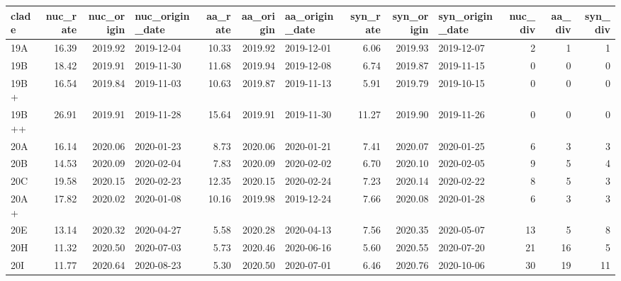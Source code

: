 \begin{tabular}{lrrlrrlrrlrrr}
\toprule
clade &  nuc\_rate &  nuc\_origin & nuc\_origin\_date &  aa\_rate &  aa\_origin & aa\_origin\_date &  syn\_rate &  syn\_origin & syn\_origin\_date &  nuc\_div &  aa\_div &  syn\_div \\
\midrule
  19A &     16.39 &     2019.92 &      2019-12-04 &    10.33 &    2019.92 &     2019-12-01 &      6.06 &     2019.93 &      2019-12-07 &        2 &       1 &        1 \\
  19B &     18.42 &     2019.91 &      2019-11-30 &    11.68 &    2019.94 &     2019-12-08 &      6.74 &     2019.87 &      2019-11-15 &        0 &       0 &        0 \\
 19B+ &     16.54 &     2019.84 &      2019-11-03 &    10.63 &    2019.87 &     2019-11-13 &      5.91 &     2019.79 &      2019-10-15 &        0 &       0 &        0 \\
19B++ &     26.91 &     2019.91 &      2019-11-28 &    15.64 &    2019.91 &     2019-11-30 &     11.27 &     2019.90 &      2019-11-26 &        0 &       0 &        0 \\
  20A &     16.14 &     2020.06 &      2020-01-23 &     8.73 &    2020.06 &     2020-01-21 &      7.41 &     2020.07 &      2020-01-25 &        6 &       3 &        3 \\
  20B &     14.53 &     2020.09 &      2020-02-04 &     7.83 &    2020.09 &     2020-02-02 &      6.70 &     2020.10 &      2020-02-05 &        9 &       5 &        4 \\
  20C &     19.58 &     2020.15 &      2020-02-23 &    12.35 &    2020.15 &     2020-02-24 &      7.23 &     2020.14 &      2020-02-22 &        8 &       5 &        3 \\
 20A+ &     17.82 &     2020.02 &      2020-01-08 &    10.16 &    2019.98 &     2019-12-24 &      7.66 &     2020.08 &      2020-01-28 &        6 &       3 &        3 \\
  20E &     13.14 &     2020.32 &      2020-04-27 &     5.58 &    2020.28 &     2020-04-13 &      7.56 &     2020.35 &      2020-05-07 &       13 &       5 &        8 \\
  20H &     11.32 &     2020.50 &      2020-07-03 &     5.73 &    2020.46 &     2020-06-16 &      5.60 &     2020.55 &      2020-07-20 &       21 &      16 &        5 \\
  20I &     11.77 &     2020.64 &      2020-08-23 &     5.30 &    2020.50 &     2020-07-01 &      6.46 &     2020.76 &      2020-10-06 &       30 &      19 &       11 \\

\end{tabular}
